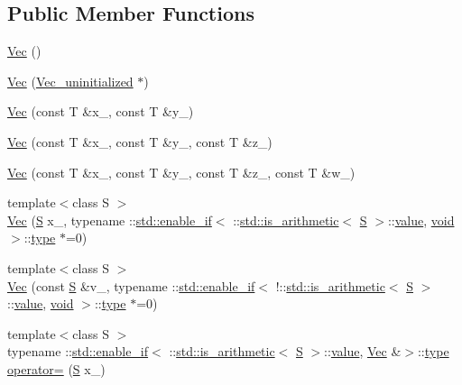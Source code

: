 \subsection*{Public Member Functions}
\begin{DoxyCompactItemize}
\item 
\hyperlink{classtrimesh_1_1Vec_ab50b05513a3d69de47888f9cbe87a9a1}{Vec} ()
\item 
\hyperlink{classtrimesh_1_1Vec_a6be5186cdbc95a77bbebc22a7efc9273}{Vec} (\hyperlink{structtrimesh_1_1Vec__uninitialized}{Vec\+\_\+uninitialized} $\ast$)
\item 
\hyperlink{classtrimesh_1_1Vec_a1dae33ffc1c803c1a62e74e5324c5915}{Vec} (const T \&x\+\_\+, const T \&y\+\_\+)
\item 
\hyperlink{classtrimesh_1_1Vec_a02fe2d006465f953933051fc0b63d218}{Vec} (const T \&x\+\_\+, const T \&y\+\_\+, const T \&z\+\_\+)
\item 
\hyperlink{classtrimesh_1_1Vec_ab03d990467a77e1b8fe1932b20d5daab}{Vec} (const T \&x\+\_\+, const T \&y\+\_\+, const T \&z\+\_\+, const T \&w\+\_\+)
\item 
{\footnotesize template$<$class S $>$ }\\\hyperlink{classtrimesh_1_1Vec_ab0ba144f62874c1fafa993ef0a706e07}{Vec} (\hyperlink{ego_8cc_abde73cd36321648268fb4543509b996a}{S} x\+\_\+, typename \+::\hyperlink{structstd_1_1enable__if}{std\+::enable\+\_\+if}$<$ \+::\hyperlink{structstd_1_1is__arithmetic}{std\+::is\+\_\+arithmetic}$<$ \hyperlink{ego_8cc_abde73cd36321648268fb4543509b996a}{S} $>$\+::\hyperlink{namespacetrimesh_ab10cc1052c9d1d1376d92211b6ca27dd}{value}, \hyperlink{namespacetrimesh_a784ddfd979e1c579bda795a8edfc3f43}{void} $>$\+::\hyperlink{namespacetrimesh_aa726c5bf9cff74a26269e8d258ae9e3d}{type} $\ast$=0)
\item 
{\footnotesize template$<$class S $>$ }\\\hyperlink{classtrimesh_1_1Vec_aafe326a296b7086232d9484456684bc3}{Vec} (const \hyperlink{ego_8cc_abde73cd36321648268fb4543509b996a}{S} \&v\+\_\+, typename \+::\hyperlink{structstd_1_1enable__if}{std\+::enable\+\_\+if}$<$ !\+::\hyperlink{structstd_1_1is__arithmetic}{std\+::is\+\_\+arithmetic}$<$ \hyperlink{ego_8cc_abde73cd36321648268fb4543509b996a}{S} $>$\+::\hyperlink{namespacetrimesh_ab10cc1052c9d1d1376d92211b6ca27dd}{value}, \hyperlink{namespacetrimesh_a784ddfd979e1c579bda795a8edfc3f43}{void} $>$\+::\hyperlink{namespacetrimesh_aa726c5bf9cff74a26269e8d258ae9e3d}{type} $\ast$=0)
\item 
{\footnotesize template$<$class S $>$ }\\typename \+::\hyperlink{structstd_1_1enable__if}{std\+::enable\+\_\+if}$<$ \+::\hyperlink{structstd_1_1is__arithmetic}{std\+::is\+\_\+arithmetic}$<$ \hyperlink{ego_8cc_abde73cd36321648268fb4543509b996a}{S} $>$\+::\hyperlink{namespacetrimesh_ab10cc1052c9d1d1376d92211b6ca27dd}{value}, \hyperlink{classtrimesh_1_1Vec}{Vec} \&$>$\+::\hyperlink{namespacetrimesh_aa726c5bf9cff74a26269e8d258ae9e3d}{type} \hyperlink{classtrimesh_1_1Vec_a9ac8f8e58310bcb2ad5e51203ce2603c}{operator=} (\hyperlink{ego_8cc_abde73cd36321648268fb4543509b996a}{S} x\+\_\+)

\end{DoxyCompactItemize}
